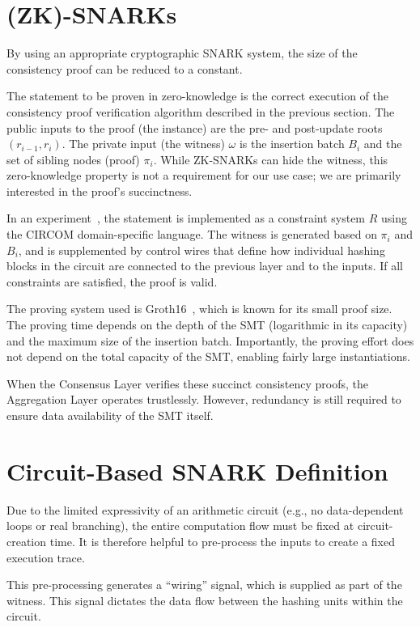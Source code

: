 \documentclass[twocolumn]{article}
\begin{document}
\section{(ZK)-SNARKs}

By using an appropriate cryptographic SNARK system, the size of the consistency proof can be reduced to a constant.

The statement to be proven in zero-knowledge is the correct execution of the consistency proof verification algorithm described in the previous section. The public inputs to the proof (the instance) are the pre- and post-update roots $(r_{i-1}, r_i)$. The private input (the witness) $\omega$ is the insertion batch $B_i$ and the set of sibling nodes (proof) $\pi_i$. While ZK-SNARKs can hide the witness, this zero-knowledge property is not a requirement for our use case; we are primarily interested in the proof's succinctness.

In an experiment~\cite{snark}, the statement is implemented as a constraint system $R$ using the CIRCOM domain-specific language. The witness is generated based on $\pi_i$ and $B_i$, and is supplemented by control wires that define how individual hashing blocks in the circuit are connected to the previous layer and to the inputs. If all constraints are satisfied, the proof is valid.

The proving system used is Groth16~\cite{cryptoeprint:2016/260}, which is known for its small proof size. The proving time depends on the depth of the SMT (logarithmic in its capacity) and the maximum size of the insertion batch. Importantly, the proving effort does not depend on the total capacity of the SMT, enabling fairly large instantiations.

When the Consensus Layer verifies these succinct consistency proofs, the Aggregation Layer operates trustlessly. However, redundancy is still required to ensure data availability of the SMT itself.


\section{Circuit-Based SNARK Definition}

Due to the limited expressivity of an arithmetic circuit (e.g., no data-dependent loops or real branching), the entire computation flow must be fixed at circuit-creation time. It is therefore helpful to pre-process the inputs to create a fixed execution trace.

This pre-processing generates a ``wiring'' signal, which is supplied as part of the witness. This signal dictates the data flow between the hashing units within the circuit.
\end{document}
